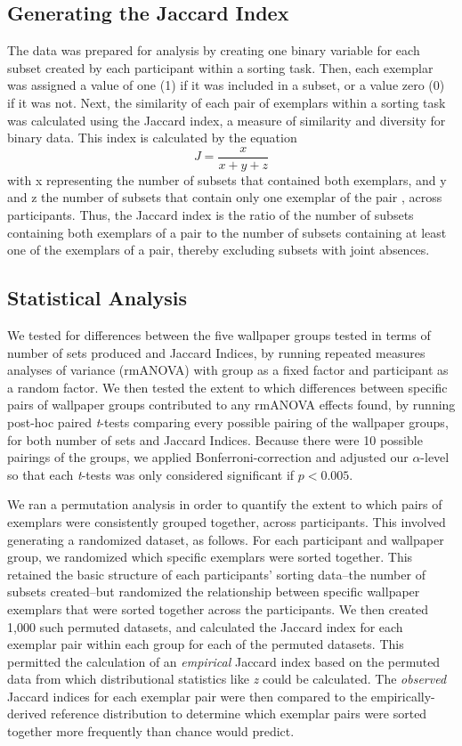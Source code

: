 \documentclass[11pt, twoside]{article}
\begin{document}
\subsection*{Generating the Jaccard Index}
The data was prepared for analysis by creating one binary variable for each subset created by each participant within a sorting task. Then, each exemplar was assigned a value of one (1) if it was included in a subset, or a value zero (0) if it was not. Next, the similarity of each pair of exemplars within a sorting task was calculated using the Jaccard index, a measure of similarity and diversity for binary data. This index is calculated by the equation  \[ J = \frac{x}{x + y + z} \] with x representing the number of subsets that contained both exemplars, and y and z the number of subsets that contain only one exemplar of the pair \citep{capra_factor_2005}, across participants. Thus, the Jaccard index is the ratio of the number of subsets containing both exemplars of a pair to the number of subsets containing at least one of the exemplars of a pair, thereby excluding subsets with joint absences.

\subsection*{Statistical Analysis}
We tested for differences between the five wallpaper groups tested in terms of number of sets produced and Jaccard Indices, by running repeated measures analyses of variance (rmANOVA) with group as a fixed factor and participant as a random factor. We then tested the extent to which differences between specific pairs of wallpaper groups contributed to any rmANOVA effects found, by running post-hoc paired \textit{t}-tests comparing every possible pairing of the wallpaper groups, for both number of sets and Jaccard Indices. Because there were 10 possible pairings of the groups, we applied Bonferroni-correction and adjusted our $\alpha$-level so that each \textit{t}-tests was only considered significant if $p < 0.005$. 

We ran a permutation analysis in order to quantify the extent to which pairs of exemplars were consistently grouped together, across participants. This involved generating a randomized dataset, as follows. For each participant and wallpaper group, we randomized which specific exemplars were sorted together. This retained the basic structure of each participants' sorting data--the number of subsets created--but randomized the relationship between specific wallpaper exemplars that were sorted together across the participants. We then created 1,000 such permuted datasets, and calculated the Jaccard index for each exemplar pair within each group for each of the permuted datasets. This permitted the calculation of an \emph{empirical} Jaccard index based on the permuted data from which distributional statistics like \textit{z} could be calculated. The \emph{observed} Jaccard indices for each exemplar pair were then compared to the empirically-derived reference distribution to determine which exemplar pairs were sorted together more frequently than chance would predict.
\end{document}
